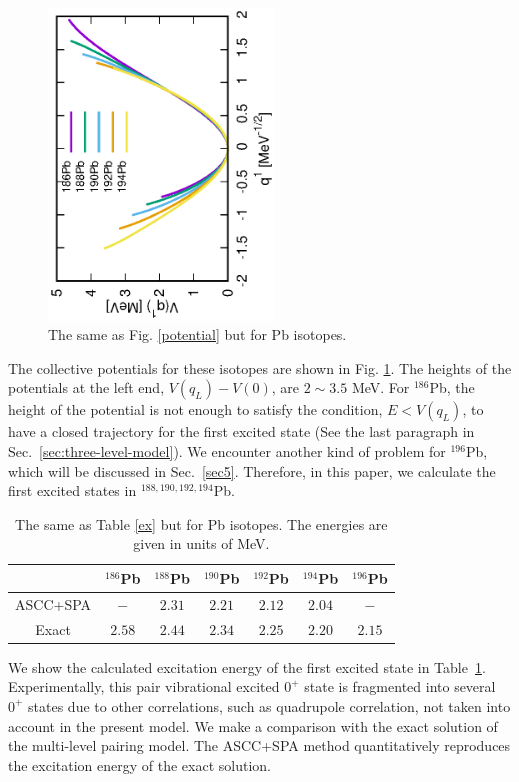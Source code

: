 \documentclass[%
superscriptaddress,
showpacs,
nofootinbib,
amsmath,amssymb,
aps,
prc,
twocolumn,
floatfix ]%
{revtex4-1}
\begin{document}
\begin{figure}[htbp]
 \begin{center}
  \includegraphics[width=60mm,angle=-90]{Pbpotential.eps}
 \end{center}
	\caption{The same as Fig. \ref{potential} but for Pb isotopes.
}
 \label{Pb_potential}
\end{figure}
The collective potentials for these isotopes are shown
in Fig. \ref{Pb_potential}.
The heights of the potentials at the left end, $V(q_L)-V(0)$,
are $2\sim3.5$ MeV.
For $^{186}$Pb, the height of the potential is not
enough to satisfy the condition, $E<V(q_L)$,
to have a closed trajectory for the first excited state
(See the last paragraph in Sec.~\ref{sec:three-level-model}).
We encounter another kind of problem for $^{196}$Pb,
which will be discussed in Sec.~\ref{sec5}.
Therefore, in this paper, we calculate the first excited states
in $^{188,190,192,194}$Pb.

\begin{table}[htbp]
\caption{The same as Table \ref{ex} but for Pb isotopes. The energies are given in units of MeV.}
  \begin{ruledtabular}
\begin{tabular}{c|cccccc}
   & ${}^{186}$Pb & ${}^{188}$Pb & ${}^{190}$Pb & ${}^{192}$Pb & ${}^{194}$Pb & ${}^{196}$Pb\\ \hline
ASCC+SPA & $-$ & $2.31$ & $2.21$ & $2.12$ & $2.04$ & $-$ \\ 
Exact & $2.58$ & $2.44$ & $2.34$ & $2.25$ & $2.20$ & $2.15$
\end{tabular}
\end{ruledtabular}
\label{Pb_ex}
\end{table}
We show the calculated excitation energy of the first excited state
in Table~\ref{Pb_ex}.
Experimentally, this pair vibrational excited $0^+$ state is
fragmented into several $0^+$ states due to other correlations,
such as quadrupole correlation, not taken into account in the present model.
We make a comparison with the exact solution of the multi-level
pairing model.
The ASCC+SPA method quantitatively reproduces the excitation energy of
the exact solution.
\end{document}

